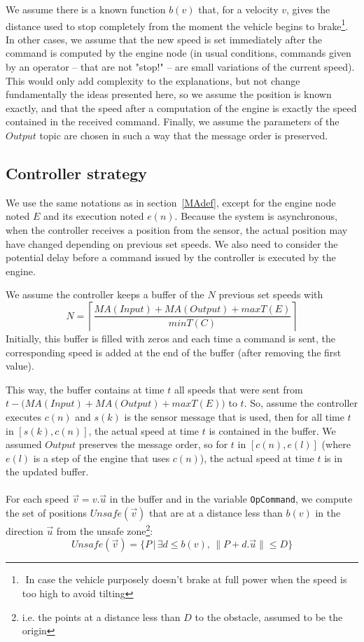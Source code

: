 We assume there is a known function $b(v)$ that, for a velocity $v$, gives the distance used to stop completely from the moment the vehicle begins to brake\footnote{$ $
In case the vehicle purposely doesn't brake at full power when the speed is too high to avoid tilting}.
In other cases, we assume that the new speed is set immediately after the command is computed by the engine node (in usual conditions, commands given by an operator -- that are not "stop!" -- are small variations of the current speed).
This would only add complexity to the explanations, but not change fundamentally the ideas presented here, so we assume the position is known exactly, and that the speed after a computation of the engine is exactly the speed contained in the received command.
Finally, we assume the parameters of the $Output$ topic are chosen in such a way that the message order is preserved.

\subsection{Controller strategy}

We use the same notations as in section~\ref{MAdef}, except for the engine node noted $E$ and its execution noted $e(n)$.
Because the system is asynchronous, when the controller receives a position from the sensor, the actual position may have changed depending on previous set speeds.
We also need to consider the potential delay before a command issued by the controller is executed by the engine.

We assume the controller keeps a buffer of the $N$ previous set speeds with
\[N = \left\lceil \frac{MA(Input) + MA(Output) + maxT(E)}{minT(C)} \right\rceil\]
Initially, this buffer is filled with zeros and each time a command is sent, the corresponding speed is added at the end of the buffer (after removing the first value).

This way, the buffer contains at time $t$ all speeds that were sent from $t - \big ( MA(Input) + MA(Output) + maxT(E) \big )$ to $t$. So, assume the controller executes $c(n)$ and $s(k)$ is the sensor message that is used, then for all time $t$ in $[s(k), c(n)]$, the actual speed at time $t$ is contained in the buffer.
We assumed $Output$ preserves the message order, so for $t$ in $[c(n), e(l)]$ (where $e(l)$ is a step of the engine that uses $c(n)$), the actual speed at time $t$ is in the updated buffer.

\paragraph{ }For each speed $\vec{v} = v.\vec{u}$ in the buffer and in the variable \texttt{OpCommand}, we compute the set of positions $Unsafe(\vec{v})$ that are at a distance less than $b(v)$ in the direction $\vec{u}$ from the unsafe zone\footnote{i.e. the points at a distance less than $D$ to the obstacle, assumed to be the origin}:
\[Unsafe(\vec{v}) = \Big \{ P \,| \, \exists d \leq b(v), \, \| P + d.\vec{u} \| \leq D \Big \} \]

